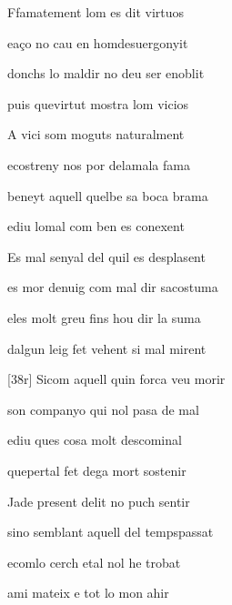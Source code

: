\documentclass[12pt]{article}
\begin{document}
\begin{estrofa}

 Ffamatement lom es dit virtuos

 ea\c{c}o no cau en homdesuergonyit

 donchs lo maldir no deu ser enoblit

 puis quevirtut mostra lom vicios

 A vici som moguts naturalment

 ecostreny nos por delamala fama

 beneyt aquell quelbe sa boca brama

 ediu lomal com ben es conexent

\end{estrofa}



\begin{estrofa}

 Es mal senyal del quil es desplasent

 es mor denuig com mal dir sacostuma

 eles molt greu fins  hou dir la suma

 dalgun leig fet vehent si mal mirent

 [38r] Sicom aquell quin forca veu morir

 son companyo qui nol pasa de mal

 ediu ques cosa molt descominal

 quepertal fet dega mort sostenir

\end{estrofa}



\begin{estrofa}

 Jade present delit no puch sentir

 sino semblant aquell del tempspassat

 ecomlo cerch etal nol he trobat

 ami mateix e tot lo mon ahir

\end{estrofa}
\end{document}
